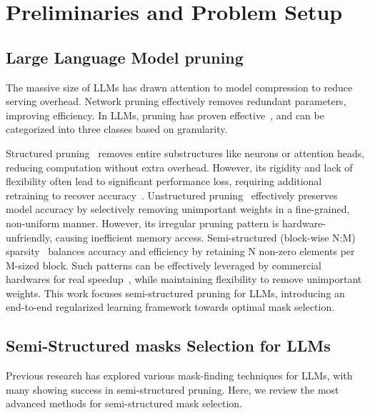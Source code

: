 \vspace{-1.5em}
\section{Preliminaries and Problem Setup}
\vspace{-0.5em}
\subsection{Large Language Model pruning}

The massive size of LLMs has drawn attention to model compression to reduce serving overhead. Network pruning effectively removes redundant parameters, improving efficiency. In LLMs, pruning has proven effective~\cite{bai2024sparsellmglobalpruningpretrained, frantar2023sparsegpt, huang2024pruning}, and can be categorized into three classes based on granularity.


Structured pruning~\cite{ma2023llm, xia2023sheared} removes entire substructures like neurons or attention heads, reducing computation without extra overhead. However, its rigidity and lack of flexibility often lead to significant performance loss, requiring additional retraining to recover accuracy~\cite{ma2023llm, xia2023sheared}.
Unstructured pruning~\cite{frankle2018lottery} effectively preserves model accuracy by selectively removing unimportant weights in a fine-grained, non-uniform manner. However, its irregular pruning pattern is hardware-unfriendly, causing inefficient memory access.
Semi-structured (block-wise N:M) sparsity~\cite{mishra2021accelerating} balances accuracy and efficiency by retaining N non-zero elements per M-sized block. Such patterns can be effectively leveraged by commercial hardwares for real speedup~\cite{fang2024maskllm, sun2023simple, mishra2021accelerating}, while maintaining flexibility to remove unimportant weights. This work focuses semi-structured pruning for LLMs, introducing an end-to-end regularized learning framework towards optimal mask selection.


\subsection{Semi-Structured masks Selection for LLMs}

Previous research has explored various mask-finding techniques for LLMs, with many showing success in semi-structured pruning. Here, we review the most advanced methods for semi-structured mask selection.


